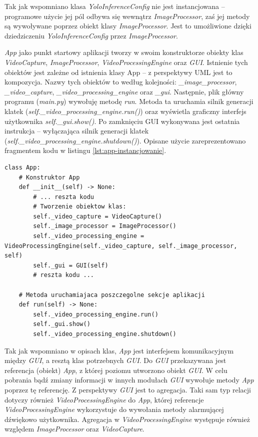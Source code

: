 Tak jak wspomniano klasa \emph{YoloInferenceConfig} nie jest instancjowana -- programowe użycie jej pól odbywa się wewnątrz \emph{ImageProcessor}, zaś jej metody są wywoływane poprzez obiekt klasy \emph{ImageProcessor}. Jest to umożliwione dzięki dziedziczeniu \emph{YoloInferenceConfig} przez \emph{ImageProcessor}.

\emph{App} jako punkt startowy aplikacji tworzy w swoim konstruktorze obiekty klas \emph{VideoCapture}, \emph{ImageProcessor}, \emph{VideoProcessingEngine} oraz \emph{GUI}. Istnienie tych obiektów jest zależne od istnienia klasy App -- z perspektywy UML jest to kompozycja. Nazwy tych obiektów to według kolejności: \emph{\_image\_processor}, \emph{\_video\_capture}, \emph{\_video\_processing\_engine} oraz \emph{\_gui}. Następnie, plik główny programu (\emph{main.py}) wywołuję metodę \emph{run}. Metoda ta uruchamia silnik generacji klatek (\emph{self.\_video\_processing\_engine.run()}) oraz wyświetla graficzny interfejs użytkownika \emph{self.\_gui.show()}. Po zamknięciu GUI wykonywana jest ostatnia instrukcja -- wyłączająca silnik generacji klatek (\emph{self.\_video\_processing\_engine.shutdown()}). Opisane użycie zareprezentowano fragmentem kodu w listingu \ref{lst:app-instancjowanie}. 

\begin{lstlisting}[caption={Tworzenie obiektów klas wewnątrz \emph{App} oraz uruchomienie w niej różnych sekcji aplikacji.}, label={lst:app-instancjowanie}]
class App:
    # Konstruktor App
    def __init__(self) -> None:
        # ... reszta kodu
        # Tworzenie obiektow klas:
        self._video_capture = VideoCapture()
        self._image_processor = ImageProcessor()
        self._video_processing_engine = VideoProcessingEngine(self._video_capture, self._image_processor, self)
        self._gui = GUI(self)
        # reszta kodu ...

    # Metoda uruchamiajaca poszczegolne sekcje aplikacji
    def run(self) -> None:
        self._video_processing_engine.run()
        self._gui.show()
        self._video_processing_engine.shutdown()
\end{lstlisting}

Tak jak wspomniano w opisach klas, \emph{App} jest interfejsem komunikacyjnym między \emph{GUI}, a resztą klas potrzebnych \emph{GUI}. Do \emph{GUI} przekazywana jest referencja (obiekt) \emph{App}, z której poziomu utworzono obiekt \emph{GUI}. W celu pobrania bądź zmiany informacji w innych modułach \emph{GUI} wywołuje metody \emph{App} poprzez tę referencję. Z perspektywy \emph{GUI} jest to agregacja. Taki sam typ relacji dotyczy również \emph{VideoProcessingEngine} do \emph{App}, której referencje \emph{VideoProcessingEngine} wykorzystuje do wywołania metody alarmującej dźwiękowo użytkownika. Agregacja w \emph{VideoProcessingEngine} występuje również względem \emph{ImageProcessor} oraz \emph{VideoCapture}.

